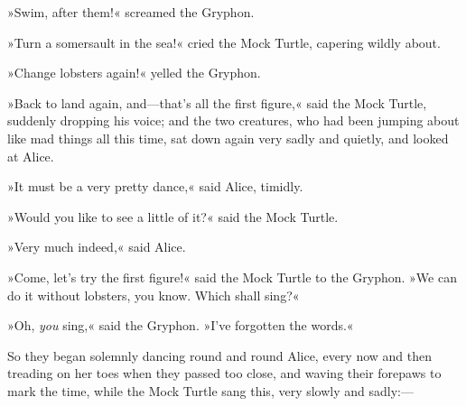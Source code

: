 »Swim, after them!« screamed the Gryphon.

»Turn a somersault in the sea!« cried the Mock Turtle, capering wildly about.

»Change lobsters again!« yelled the Gryphon.

»Back to land again, and—that's all the first figure,« said the Mock Turtle, suddenly dropping his voice; and the two creatures, who had been jumping about like mad things all this time, sat down again very sadly and quietly, and looked at Alice.

»It must be a very pretty dance,« said Alice, timidly.

»Would you like to see a little of it?« said the Mock Turtle.

»Very much indeed,« said Alice.

»Come, let's try the first figure!« said the Mock Turtle to the Gryphon. »We can do it without lobsters, you know. Which shall sing?«

»Oh, \textit{you} sing,« said the Gryphon. »I've forgotten the words.«

So they began solemnly dancing round and round Alice, every now and then treading on her toes when they passed too close, and waving their forepaws to mark the time, while the Mock Turtle sang this, very slowly and sadly:—

